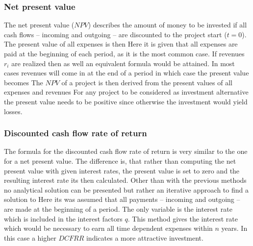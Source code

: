         \subsubsection{Net present value}
            The net present value ($NPV$) describes the amount of money to be invested if all cash flows --
            incoming and outgoing -- are discounted to the project start ($t = 0$). The present value of
            all expenses is then
            Here it is given that all expenses are paid at the beginning of each period, as it is the most common case.
            If revenues $r_i$ are realized then as well an equivalent formula would be attained. In most cases
            revenues will come in at the end of a period in which case the present value becomes
            The $NPV$ of a project is then derived from the present values of all expenses and revenues
            For any project to be considered as investment alternative the present value needs to be positive since
            otherwise the investment would yield losses.

        \subsubsection{Discounted cash flow rate of return}
            The formula for the discounted cash flow rate of return is very similar to the one for a net present value.
            The difference is, that rather than computing the net present value with given interest rates, the present
            value is set to zero and the resulting interest rate its then calculated. Other than with the previous methods
            no analytical solution can be presented but rather an iterative approach to find a solution to
            Here its was assumed that all payments -- incoming and outgoing -- are made at the beginning of a period.
            The only variable is the interest rate which is included in the interest factors $q$. This method gives
            the interest rate which would be necessary to earn all time dependent expenses within $n$ years. In this
            case a higher $DCFRR$ indicates a more attractive investment.

